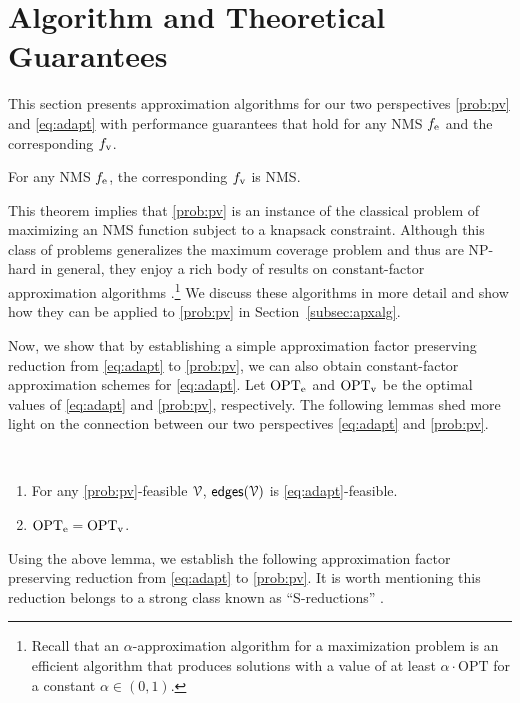 \documentclass[conference]{IEEEtran}
\begin{document}
\section{Algorithm and Theoretical Guarantees}
\label{sec:algorithm}

This section presents approximation algorithms for our two perspectives \ref{prob:pv} and
\ref{eq:adapt} with performance guarantees
that hold for any NMS $f_\text{e}$ and the corresponding $f_\text{v}$.

\begin{theorem}
  \normalfont
  For any NMS $f_\text{e}$, the corresponding $f_\text{v}$ is NMS.
  \label{thm:fe2fv}
\end{theorem}
This theorem implies that \ref{prob:pv} is an instance
of the classical problem of maximizing an NMS function subject to a knapsack
constraint. Although this class of problems generalizes the maximum coverage
problem \cite{hochbaum1996approximation} and thus are NP-hard in general, they enjoy a rich
body of results on constant-factor approximation algorithms
\cite{krauseSurvey}.\footnote{Recall that an $\alpha$-approximation algorithm for a maximization problem is an efficient
algorithm that produces solutions with a value of at least $\alpha\cdot\mathrm{OPT}$ for a constant $\alpha \in (0,1)$.}
We discuss these algorithms in more detail and show how they can be applied to
\ref{prob:pv} in Section~\ref{subsec:apxalg}.

Now, we show that by establishing a simple approximation factor
preserving reduction from \ref{eq:adapt} to \ref{prob:pv}, we can also
obtain constant-factor approximation schemes for \ref{eq:adapt}. 
Let $\mathrm{OPT}_\text{e}$ and
$\mathrm{OPT}_\text{v}$ be the optimal values of \ref{eq:adapt} and \ref{prob:pv},
respectively.
The following lemmas shed more light on the connection between our two
perspectives \ref{eq:adapt} and \ref{prob:pv}.

\begin{lemma}
  \normalfont
  \leavevmode\\[0.1cm]
  \vspace{-0.5cm}
  \begin{enumerate}
	\item For any \ref{prob:pv}-feasible ${\mathcal{V}}$,
	  ${\mathsf{edges}(\mathcal{V})}$ is \ref{eq:adapt}-feasible.
	\item $\mathrm{OPT}_\text{e} = \mathrm{OPT}_\text{v}$. 
  \end{enumerate}
  \label{th:opts}
\end{lemma}
Using the above lemma, we establish the following approximation factor preserving reduction from 
\ref{eq:adapt} to \ref{prob:pv}.
It is worth mentioning this reduction belongs to a strong class known as 
\mbox{``S-reductions''} \cite{crescenzi1997short,
ausiello2012complexity}.
\end{document}
